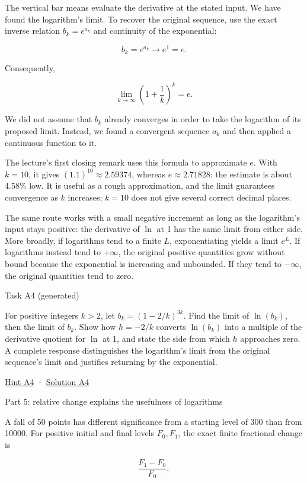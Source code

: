 \documentclass[
  11pt,
]{article}
\begin{document}
The vertical bar means evaluate the derivative at the stated input. We
have found the logarithm's limit. To recover the original sequence, use
the exact inverse relation \(b_k=e^{a_k}\) and continuity of the
exponential:

\[
b_k=e^{a_k}\longrightarrow e^1=e.
\]

Consequently,

\[
\lim_{k\to\infty}\left(1+\frac1k\right)^k=e.
\]

We did not assume that \(b_k\) already converges in order to take the
logarithm of its proposed limit. Instead, we found a convergent sequence
\(a_k\) and then applied a continuous function to it.

The lecture's first closing remark uses this formula to approximate
\(e\). With \(k=10\), it gives \((1.1)^{10}\approx2.59374\), whereas
\(e\approx2.71828\): the estimate is about 4.58\% low. It is useful as a
rough approximation, and the limit guarantees convergence as \(k\)
increases; \(k=10\) does not give several correct decimal places.

The same route works with a small negative increment as long as the
logarithm's input stays positive: the derivative of \(\ln\) at 1 has the
same limit from either side. More broadly, if logarithms tend to a
finite \(L\), exponentiating yields a limit \(e^L\). If logarithms
instead tend to \(+\infty\), the original positive quantities grow
without bound because the exponential is increasing and unbounded. If
they tend to \(-\infty\), the original quantities tend to zero.

Task A4 (generated)

For positive integers \(k>2\), let \(b_k=(1-2/k)^{3k}\). Find the limit
of \(\ln(b_k)\), then the limit of \(b_k\). Show how \(h=-2/k\) converts
\(\ln(b_k)\) into a multiple of the derivative quotient for \(\ln\) at
1, and state the side from which \(h\) approaches zero. A complete
response distinguishes the logarithm's limit from the original
sequence's limit and justifies returning by the exponential.

\protect\hyperlink{hint-a4}{Hint A4} ·
\protect\hyperlink{solution-a4}{Solution A4}

Part 5: relative change explains the usefulness of logarithms

A fall of 50 points has different significance from a starting level of
300 than from 10000. For positive initial and final levels \(F_0,F_1\),
the exact finite fractional change is

\[
\frac{F_1-F_0}{F_0},
\]
\end{document}
